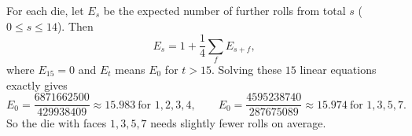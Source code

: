 For each die, let $E_s$ be the expected number of further rolls from total $s$ ($0\le s\le14$). Then
\[E_s=1+\dfrac14\sum_{f}E_{s+f},\]
where $E_{15}=0$ and $E_t$ means $E_0$ for $t>15$. Solving these $15$ linear equations exactly gives
\[E_0=\dfrac{6871662500}{429938409}\approx15.983\ \text{for }1,2,3,4,\qquad E_0=\dfrac{4595238740}{287675089}\approx15.974\ \text{for }1,3,5,7.\]
So the die with faces $\boxed{1,3,5,7}$ needs slightly fewer rolls on average.
